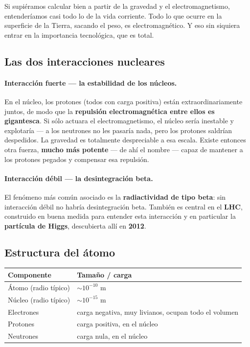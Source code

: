 \documentclass[12pt,a4paper]{article}
\begin{document}
\begin{keybox}
Si supiéramos calcular bien a partir de la gravedad y el electromagnetismo,
entenderíamos casi todo lo de la vida corriente. Todo lo que ocurre en la
superficie de la Tierra, sacando el peso, es electromagnético. Y eso sin siquiera
entrar en la importancia tecnológica, que es total.
\end{keybox}

\subsection{Las dos interacciones nucleares}

\paragraph{Interacción fuerte --- la estabilidad de los núcleos.}
En el núcleo, los protones (todos con carga positiva) están extraordinariamente
juntos, de modo que la \textbf{repulsión electromagnética entre ellos es
gigantesca}. Si sólo actuara el electromagnetismo, el núcleo sería inestable y
explotaría --- a los neutrones no les pasaría nada, pero los protones saldrían
despedidos. La gravedad es totalmente despreciable a esa escala. Existe entonces
otra fuerza, \textbf{mucho más potente} --- de ahí el nombre --- capaz de
mantener a los protones pegados y compensar esa repulsión.

\paragraph{Interacción débil --- la desintegración beta.}
El fenómeno más común asociado es la \textbf{radiactividad de tipo beta}: sin
interacción débil no habría desintegración beta. También es central en el
\textbf{LHC}, construido en buena medida para entender esta interacción y en
particular la \textbf{partícula de Higgs}, descubierta allí en \textbf{2012}.

\subsection{Estructura del átomo}

\begin{table}[H]
\centering
\begin{tabular}{ll}
\toprule
\textbf{Componente} & \textbf{Tamaño / carga} \\
\midrule
Átomo (radio típico)  & $\sim 10^{-10}$ m \\
Núcleo (radio típico) & $\sim 10^{-15}$ m \\
Electrones            & carga negativa, muy livianos, ocupan todo el volumen \\
Protones              & carga positiva, en el núcleo \\
Neutrones             & carga nula, en el núcleo \\
\bottomrule
\end{tabular}
\end{table}
\end{document}
